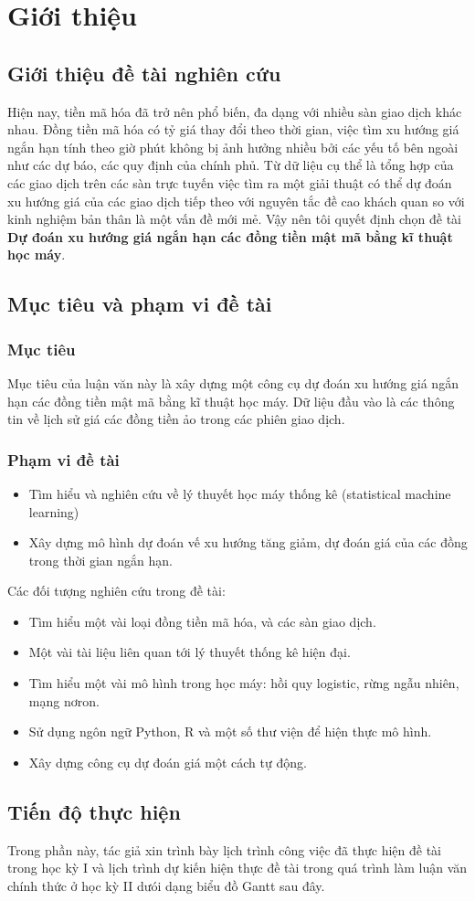 \chapter{Giới thiệu} 
\section{Giới thiệu đề tài nghiên cứu}
Hiện nay, tiền mã hóa đã trở nên phổ biến, đa dạng với nhiều sàn giao dịch khác nhau. Đồng tiền mã hóa có tỷ giá thay đổi theo thời gian, việc tìm xu hướng giá ngắn hạn tính theo giờ phút không bị ảnh hưởng nhiều bởi các yếu tố bên ngoài như các dự báo, các quy định của chính phủ. Từ dữ liệu cụ thể là tổng hợp của các giao dịch trên các sàn trực tuyến việc tìm ra một giải thuật có thể dự đoán xu hướng giá của các giao dịch tiếp theo với nguyên tắc đề cao khách quan so với kinh nghiệm bản thân là một vấn đề mới mẻ. Vậy nên tôi quyết định chọn đề tài \textbf{Dự đoán xu hướng giá ngắn hạn các đồng tiền mật mã bằng kĩ thuật học máy}.
\section{Mục tiêu và phạm vi đề tài}
\subsection{Mục tiêu}

Mục tiêu của luận văn này là xây dựng một công cụ dự đoán xu hướng giá ngắn hạn các đồng tiền mật mã bằng kĩ thuật học máy. Dữ liệu đầu vào là các thông tin về lịch sử giá các  đồng tiền ảo trong các phiên giao dịch.

\subsection{Phạm vi đề tài}
\begin{itemize}
\item Tìm hiểu và nghiên cứu về lý thuyết học máy thống kê (statistical machine learning)
\item Xây dựng mô hình dự đoán vế xu hướng tăng giảm, dự đoán giá của các đồng trong thời gian ngắn hạn.
\end{itemize}
Các đối tượng nghiên cứu trong đề tài:
\begin{itemize}
\item Tìm hiểu một vài loại đồng tiền mã hóa, và các sàn giao dịch.
\item Một vài tài liệu liên quan tới lý thuyết thống kê hiện đại.
\item Tìm hiểu một vài mô hình trong học máy: hồi quy logistic, rừng ngẫu nhiên, mạng nơron.
\item Sử dụng ngôn ngữ Python, R và một số thư viện để hiện thực mô hình.
\item Xây dựng công cụ dự đoán giá một cách tự động.
\end{itemize}

\section{Tiến độ thực hiện}
Trong phần này, tác giả xin trình bày lịch trình công việc đã thực hiện đề tài trong học
kỳ I và lịch trình dự kiến hiện thực đề tài trong quá trình làm luận văn chính thức ở học
kỳ II dưói dạng biểu đồ Gantt sau đây.

